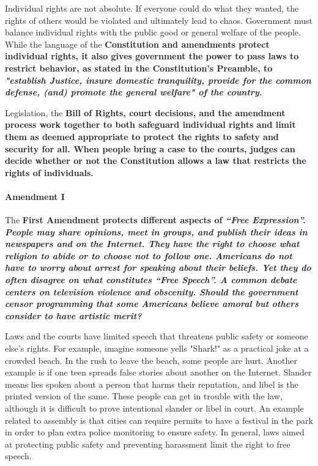 Individual rights are not absolute. If everyone could do what they wanted, the rights of others would be violated and ultimately lead to chaos. Government must balance individual rights with the public good or general welfare of the people. While the language of the \bf{Constitution} and amendments protect individual rights, it also gives government the power to pass laws to restrict behavior, as stated in the \bf{Constitution's Preamble}, to \it{"establish Justice, insure domestic tranquility, provide for the common defense, (and) promote the general welfare"} of the country.

Legislation, the \bf{Bill of Rights}, court decisions, and the amendment process work together to both safeguard individual rights and limit them as deemed appropriate to protect the rights to safety and security for all. When people bring a case to the courts, judges can decide whether or not the Constitution allows a law that restricts the rights of individuals.

\paragraph{Amendment I}

The \bf{First Amendment} protects different aspects of \it{“Free Expression”}. People may share opinions, meet in groups, and publish their ideas in newspapers and on the Internet. They have the right to choose what religion to abide or to choose not to follow one. Americans do not have to worry about arrest for speaking about their beliefs. 
Yet they do often disagree on what constitutes \it{“Free Speech”}. A common debate centers on television violence and obscenity. Should the government censor programming that some Americans believe amoral but others consider to have artistic merit?

Laws and the courts have limited speech that threatens public safety or someone else's rights. For example, imagine someone yells "Shark!" as a practical joke at a crowded beach. In the rush to leave the beach, some people are hurt. Another example is if one teen spreads false stories about another on the Internet. Slander means lies spoken about a person that harms their reputation, and libel is the printed version of the same. These people can get in trouble with the law, although it is difficult to prove intentional slander or libel in court. An example related to assembly is that cities can require permits to have a festival in the park in order to plan extra police monitoring to ensure safety. In general, laws aimed at protecting public safety and preventing harassment limit the right to free speech.

